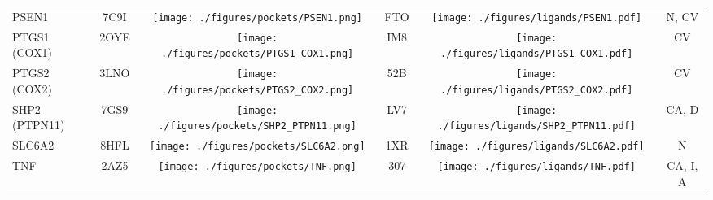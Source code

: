 \begin{ThreePartTable}
\begin{longtable}{ l @{\extracolsep{\fill}} *{5}{c} }
PSEN1                                 & 7C9I            &       \texttt{[image: ./figures/pockets/PSEN1.png]}                    & FTO                    &\texttt{[image: ./figures/ligands/PSEN1.pdf]}                                              & N, CV     \\
PTGS1 (COX1)                          & 2OYE            &      \texttt{[image: ./figures/pockets/PTGS1\_COX1.png]}                     & IM8                    &\texttt{[image: ./figures/ligands/PTGS1\_COX1.pdf]}                                               & CV                              \\
PTGS2 (COX2)                          & 3LNO            &      \texttt{[image: ./figures/pockets/PTGS2\_COX2.png]}                     & 52B                    &\texttt{[image: ./figures/ligands/PTGS2\_COX2.pdf]}                                               & CV                              \\
SHP2 (PTPN11)                         & 7GS9            &      \texttt{[image: ./figures/pockets/SHP2\_PTPN11.png]}                     & LV7                    &\texttt{[image: ./figures/ligands/SHP2\_PTPN11.pdf]}                                               & CA, D                                    \\
SLC6A2                                & 8HFL            &      \texttt{[image: ./figures/pockets/SLC6A2.png]}                     & 1XR                    &\texttt{[image: ./figures/ligands/SLC6A2.pdf]}                                               & N                             \\
TNF                                   & 2AZ5            &       \texttt{[image: ./figures/pockets/TNF.png]}                    & 307                    &\texttt{[image: ./figures/ligands/TNF.pdf]}                                              & CA, I, A  

\end{longtable}   
\end{ThreePartTable}
